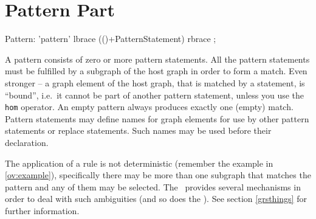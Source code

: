 \section{Pattern Part}
\label{patternpart}
\begin{rail}
  Pattern: 'pattern' lbrace (()+PatternStatement) rbrace ;
\end{rail}
A pattern consists of zero or more pattern statements. All the pattern statements must be fulfilled by a subgraph of the host graph in order to form a match. Even stronger -- a graph element of the host graph, that is matched by a statement, is ``bound'', i.e.\ it cannot be part of another pattern statement, unless you use the \texttt{hom} operator. An empty pattern always produces exactly one (empty) match.\\
Pattern statements may define names for graph elements for use by other pattern statements or replace statements. Such names may be used before their declaration.
\begin{note}
The application of a rule is not deterministic (remember the example in \ref{ov:example}), specifically there may be more than one subgraph that matches the pattern and any of them may be selected. The \LibGr\ provides several mechanisms in order to deal with such ambiguities (and so does the \GrShell). See section \ref{grsthings} for further information.
\end{note}

